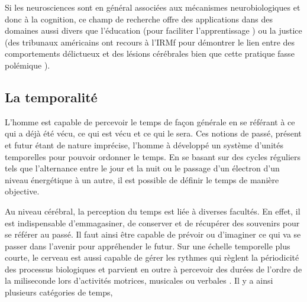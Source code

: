 \documentclass[12pt,fleqn,oneside,openany]{book} %
\begin{document}
Si les neurosciences sont en général associées aux mécanismes neurobiologiques et donc à la cognition, ce champ de recherche offre des applications dans des domaines aussi divers que l'éducation (pour faciliter l'apprentissage \cite{pedagogie}) ou la justice (des tribunaux américains ont recours à l'IRMf pour démontrer le lien entre des comportements délictueux et des lésions cérébrales bien que cette pratique fasse polémique \cite{justice}).

\subsection[La temporalité]{La temporalité \cite{reptemps,basePerception}} \label{ssec:temporalite} %
L'homme est capable de percevoir le temps de façon générale en se référant à ce qui a déjà été vécu, ce qui est vécu et ce qui le sera. Ces notions de passé, présent et futur étant de nature imprécise, l'homme à développé un système d'unités temporelles pour pouvoir ordonner le temps. En se basant sur des cycles réguliers tels que l'alternance entre le jour et la nuit ou le passage d'un électron d'un niveau énergétique à un autre, il est possible de définir le temps de manière objective. 

Au niveau cérébral, la perception du temps est liée à diverses facultés. En effet, il est indispensable d'emmagasiner, de conserver et de récupérer des souvenirs pour se référer au passé. Il faut ainsi être capable de prévoir ou d'imaginer ce qui va se passer dans l'avenir pour appréhender le futur. Sur une échelle temporelle plus courte, le cerveau est aussi capable de gérer les rythmes qui règlent la périodicité des processus biologiques et parvient en outre à percevoir des durées de l'ordre de la miliseconde lors d'activités motrices, musicales ou verbales \cite{perceptionTemps}. Il y a ainsi plusieurs catégories de temps, \cite{tempsEtIllusions}
\end{document}

